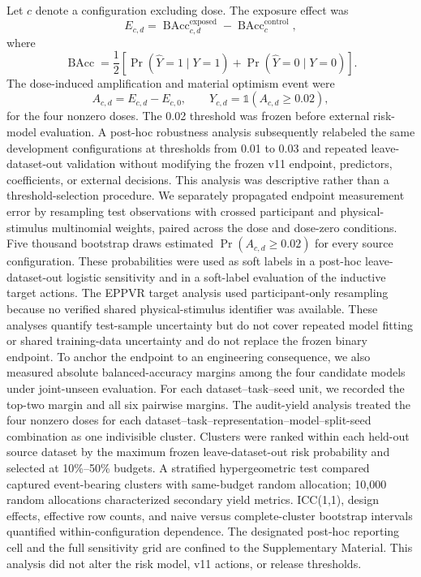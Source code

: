 \documentclass[preprint,12pt]{elsarticle}
\begin{document}
Let $c$ denote a configuration excluding dose. The exposure effect was
\begin{equation}
E_{c,d}=\operatorname{BAcc}^{\mathrm{exposed}}_{c,d}-\operatorname{BAcc}^{\mathrm{control}}_{c},
\end{equation}
where
\begin{equation}
\operatorname{BAcc}=\frac{1}{2}\left[\Pr(\hat Y=1\mid Y=1)+\Pr(\hat Y=0\mid Y=0)\right].
\end{equation}
The dose-induced amplification and material optimism event were
\begin{equation}
A_{c,d}=E_{c,d}-E_{c,0},\qquad Y_{c,d}=\mathbb{1}(A_{c,d}\geq0.02),
\end{equation}
for the four nonzero doses. The 0.02 threshold was frozen before external risk-model evaluation.
A post-hoc robustness analysis subsequently relabeled the same development configurations at thresholds from 0.01 to 0.03 and repeated leave-dataset-out validation without modifying the frozen v11 endpoint, predictors, coefficients, or external decisions. This analysis was descriptive rather than a threshold-selection procedure. We separately propagated endpoint measurement error by resampling test observations with crossed participant and physical-stimulus multinomial weights, paired across the dose and dose-zero conditions. Five thousand bootstrap draws estimated $\Pr(A_{c,d}\geq0.02)$ for every source configuration. These probabilities were used as soft labels in a post-hoc leave-dataset-out logistic sensitivity and in a soft-label evaluation of the inductive target actions. The EPPVR target analysis used participant-only resampling because no verified shared physical-stimulus identifier was available. These analyses quantify test-sample uncertainty but do not cover repeated model fitting or shared training-data uncertainty and do not replace the frozen binary endpoint.
To anchor the endpoint to an engineering consequence, we also measured absolute balanced-accuracy margins among the four candidate models under joint-unseen evaluation. For each dataset--task--seed unit, we recorded the top-two margin and all six pairwise margins. The audit-yield analysis treated the four nonzero doses for each dataset--task--representation--model--split-seed combination as one indivisible cluster. Clusters were ranked within each held-out source dataset by the maximum frozen leave-dataset-out risk probability and selected at 10\%--50\% budgets. A stratified hypergeometric test compared captured event-bearing clusters with same-budget random allocation; 10,000 random allocations characterized secondary yield metrics. ICC(1,1), design effects, effective row counts, and naive versus complete-cluster bootstrap intervals quantified within-configuration dependence. The designated post-hoc reporting cell and the full sensitivity grid are confined to the Supplementary Material. This analysis did not alter the risk model, v11 actions, or release thresholds.
\end{document}
